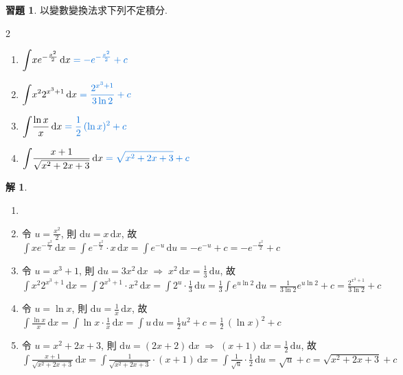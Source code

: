 \documentclass[12pt]{extarticle}
\newcommand{\ds}{\displaystyle}
\newcommand{\ie}{\;\Longrightarrow\;}
\theoremstyle{definition}
\newtheorem*{sol}{解}
\newtheorem*{exe}{習題}
\begin{document}
\begin{exe} 以變數變換法求下列不定積分. 
  \setlength{\columnsep}{-1cm}
  \begin{multicols}{2}
    \begin{enumerate}\setlength{\itemsep}{0pt}
      \item $\ds\int\!x e^{-\frac{x^2}{2}}\,\mathrm{d}x {\color{C2}\;= -e^{-\frac{x^2}{2}} + c}$
      \item $\ds\int\!x^2 2^{x^3 + 1}\,\mathrm{d}x {\color{C2}\;= \frac{2^{x^3 + 1}}{3\ln 2} + c}$
      \item $\ds\int\!\frac{\ln x}{x}\,\mathrm{d}x {\color{C2}\;= \frac{1}{2}\,(\ln x)^2 + c}$
      \item $\ds\int\!\frac{x + 1}{\sqrt{x^2 + 2x + 3}}\,\mathrm{d}x {\color{C2}\;= \sqrt{x^2 + 2x + 3} + c}$
    \end{enumerate} 
  \end{multicols}
\end{exe}

\begin{sol}
  \begin{enumerate}\setlength{\itemsep}{0pt}
    \item[]
    \item 令 $\ds u = \frac{x^2}{2}$, 則 $\ds\text{d}u = x\,\text{d}x$, 故 $\ds\int x e^{-\frac{x^2}{2}}\,\mathrm{d}x = \int e^{-\frac{x^2}{2}}\cdot x\,\mathrm{d}x = \int e^{-u}\,\text{d}u = -e^{-u} + c = -e^{-\frac{x^2}{2}} + c$
    \item 令 $\ds u = x^3 + 1$, 則 $\ds\text{d} u = 3 x^2\,\text{d}x\ie x^2\,\text{d}x = \frac{1}{3}\,\text{d}u$, 故 $\ds\int x^2 2^{x^3 + 1}\,\mathrm{d}x = \int 2^{x^3 + 1}\cdot x^2\,\text{d}x = \int 2^u\cdot\frac{1}{3}\,\text{d}u = \frac{1}{3}\int e^{u\ln 2}\,\text{d}u = \frac{1}{3\ln 2}e^{u\ln 2} + c = \frac{2^{x^3 + 1}}{3\ln 2} + c$
    \item 令 $\ds u = \ln x$, 則 $\ds\text{d} u = \frac{1}{x}\,\text{d}x$, 故 $\ds\int\!\frac{\ln x}{x}\,\mathrm{d}x = \int\!\ln x\cdot\frac{1}{x}\,\text{d}x = \int u\,\text{d}u = \frac{1}{2} u^2 + c = \frac{1}{2}\,(\ln x)^2 + c$
    \item 令 $\ds u = x^2 + 2x + 3$, 則 $\ds\text{d} u = (2 x + 2)\,\text{d}x\ie (x + 1)\,\text{d}x = \frac{1}{2}\,\text{d}u$, 故 $\ds\int\!\frac{x + 1}{\sqrt{x^2 + 2x + 3}}\,\mathrm{d}x = \int\!\frac{1}{\sqrt{x^2 + 2x + 3}}\cdot(x + 1)\,\text{d}x = \int\!\frac{1}{\sqrt{u}}\cdot\frac{1}{2}\,\text{d}u = \sqrt{u} + c = \sqrt{x^2 + 2x + 3} + c$
  \end{enumerate}
\end{sol}
\end{document}
